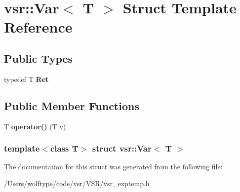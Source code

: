 \hypertarget{structvsr_1_1_var}{\section{vsr\-:\-:Var$<$ T $>$ Struct Template Reference}
\label{structvsr_1_1_var}
}
\subsection*{Public Types}
\begin{DoxyCompactItemize}
\item 
\hypertarget{structvsr_1_1_var_a71b1dfac555bb0ee645a6c54f67ce2f9}{typedef T {\bfseries Ret}}\label{structvsr_1_1_var_a71b1dfac555bb0ee645a6c54f67ce2f9}

\end{DoxyCompactItemize}
\subsection*{Public Member Functions}
\begin{DoxyCompactItemize}
\item 
\hypertarget{structvsr_1_1_var_a9c0acbbf1f3da30b32efae733bb7ec13}{T {\bfseries operator()} (T v)}\label{structvsr_1_1_var_a9c0acbbf1f3da30b32efae733bb7ec13}

\end{DoxyCompactItemize}
\subsubsection*{template$<$class T$>$ struct vsr\-::\-Var$<$ T $>$}



The documentation for this struct was generated from the following file\-:\begin{DoxyCompactItemize}
\item 
/\-Users/wolftype/code/vsr/\-V\-S\-R/vsr\-\_\-exptemp.\-h\end{DoxyCompactItemize}
